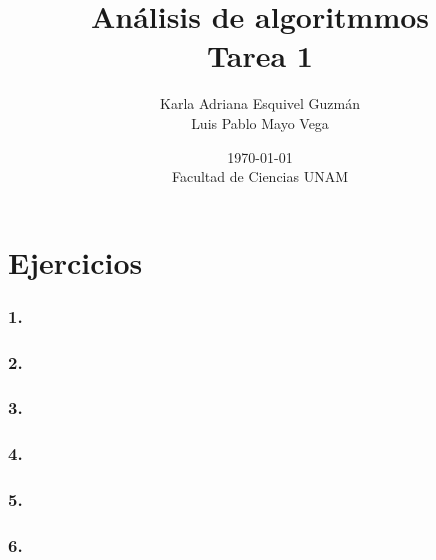 \documentclass[12pt]{article}
\title{Análisis de algoritmmos \\ Tarea 1}
\author{Karla Adriana Esquivel Guzmán \\ Luis Pablo Mayo Vega}
\date{\today \\ Facultad de Ciencias UNAM}
\begin{document}
\maketitle

\section*{Ejercicios}
\subsubsection*{1.}
\subsubsection*{2.}
\subsubsection*{3.}
\subsubsection*{4.}
\subsubsection*{5.}
\subsubsection*{6.}
\end{document}

